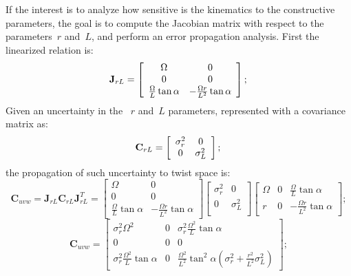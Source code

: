 If the interest is to analyze how sensitive is the kinematics to the constructive parameters, the goal is to compute the Jacobian matrix with respect to the parameters~$r$ and~$L$, and perform an error propagation analysis. First the linearized relation is: 
\begin{equation}
\mathbf{J}_{r L} = 
\left[
 \begin{array}{cc}
  \Omega & 0  \\
  0 & 0  \\
  \frac{\Omega}{L}\tan \alpha & -\frac{\Omega r}{L^2}\tan \alpha
 \end{array}
 \right]; \\ 
\end{equation}
Given an uncertainty in the ~$r$ and~$L$ parameters, represented with a covariance matrix as:
\begin{equation}
\mathbf{C}_{r L} = 
\left[
 \begin{array}{cc}
  \sigma^2_r & 0  \\
  0 & \sigma^2_L  \\
 \end{array}
 \right]; \\ 
\end{equation}
the propagation of such uncertainty to twist space is: 
\begin{equation}
\mathbf{C}_{uvw} = \mathbf{J}_{r L} \mathbf{C}_{r L} \mathbf{J}_{r L}^T = 
 \left[
 \begin{array}{cc}
  \Omega & 0  \\
  0 & 0  \\
  \frac{\Omega}{L}\tan \alpha & -\frac{\Omega r}{L^2}\tan \alpha
 \end{array}
 \right]
 \left[
 \begin{array}{cc}
  \sigma^2_r & 0  \\
  0 & \sigma^2_L  \\
 \end{array}
 \right]
 \left[
 \begin{array}{ccc}
  \Omega & 0 & \frac{\Omega}{L}\tan \alpha\\
  r & 0 & -\frac{\Omega r}{L^2}\tan \alpha
 \end{array}
 \right];
\end{equation}
\begin{equation}
\mathbf{C}_{uvw} = 
 \left[
 \begin{array}{ccc}
  \sigma^2_r \Omega^2 & 0 & \sigma^2_r \frac{\Omega^2}{L}\tan \alpha\\
  0 & 0 & 0\\
  \sigma^2_r \frac{\Omega^2}{L}\tan \alpha & 0 & \frac{\Omega^2}{L^2}\tan^2 \alpha (\sigma^2_r+\frac{r^2}{L^2} \sigma^2_L )
 \end{array}
 \right];
\end{equation}
